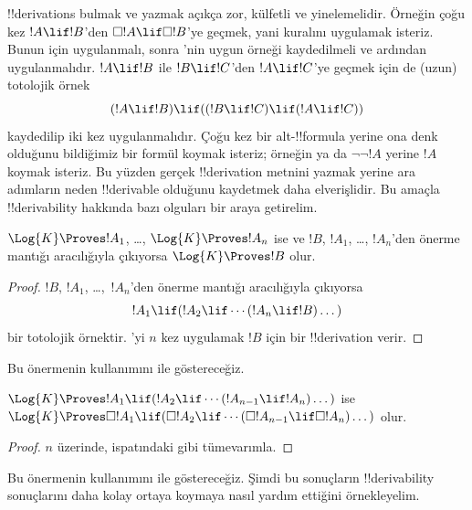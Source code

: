 



!!{derivation}s bulmak ve yazmak açıkça zor, külfetli ve yinelemelidir.
Örneğin çoğu kez $!A \lif !B$'den $\Box !A \lif \Box !B$'ye geçmek, yani
\RK{} kuralını uygulamak isteriz. Bunun için \Nec{} uygulanmalı, sonra
'nin uygun örneği kaydedilmeli ve ardından \MP{} uygulanmalıdır.
$!A \lif !B$ ile $!B \lif !C$'den $!A \lif !C$'ye geçmek için de (uzun)
totolojik örnek
\[
(!A \lif !B) \lif ((!B \lif !C) \lif (!A \lif !C))
\]
kaydedilip \MP{} iki kez uygulanmalıdır. Çoğu kez bir alt-!!{formula} yerine
ona denk olduğunu bildiğimiz bir formül koymak isteriz; örneğin
 ya da $\lnot\lnot !A$ yerine $!A$ koymak
isteriz. Bu yüzden gerçek !!{derivation} metnini yazmak yerine ara adımların neden
!!{derivable} olduğunu kaydetmek daha elverişlidir. Bu amaçla
!!{derivability} hakkında bazı olguları bir araya getirelim.

\begin{prop}
  $\Log{K} \Proves !A_1$, \dots, $\Log{K} \Proves !A_n$ ise ve $!B$,
  $!A_1$, \dots, $!A_n$'den önerme mantığı aracılığıyla çıkıyorsa
  $\Log{K} \Proves !B$ olur.
\end{prop}

\begin{proof}
  $!B$, $!A_1$, \dots,~$!A_n$'den önerme mantığı aracılığıyla çıkıyorsa
  \[
  !A_1 \lif (!A_2 \lif \cdots (!A_n \lif !B)\dots)
  \]
  bir totolojik örnektir. \MP{}'yi $n$ kez uygulamak $!B$ için bir
  !!{derivation} verir.
\end{proof}

Bu önermenin kullanımını \PL{} ile göstereceğiz.

\begin{prop}
  $\Log{K} \Proves !A_1 \lif (!A_2 \lif \cdots (!A_{n-1} \lif
  !A_n)\dots)$ ise $\Log{K} \Proves \Box !A_1 \lif (\Box !A_2 \lif
  \cdots (\Box !A_{n-1} \lif \Box !A_n)\dots)$ olur.
\end{prop}

\begin{proof}
  $n$ üzerinde,  ispatındaki gibi tümevarımla.
\end{proof}

Bu önermenin kullanımını \RK{} ile göstereceğiz. Şimdi bu sonuçların
!!{derivability} sonuçlarını daha kolay ortaya koymaya nasıl yardım ettiğini
örnekleyelim.

